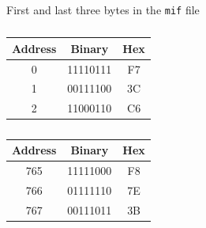 \documentclass[letterpaper, 12pt]{article} %
\begin{document}
\begin{table}[!htb]
    \caption{First and last three bytes in the \texttt{mif} file}
    \begin{subtable}{.5\linewidth}
      \centering
        \caption{}
        \begin{tabular}{|c|c|c|}
            \hline
            Address & Binary & Hex \\ \hline
            0 & 11110111 & F7 \\ \hline
            1 & 00111100 & 3C \\ \hline
            2 & 11000110 & C6 \\ \hline
        \end{tabular}
    \end{subtable}%
    \begin{subtable}{.5\linewidth}
      \centering
        \caption{}
        \begin{tabular}{|c|c|c|}
            \hline
            Address & Binary & Hex \\ \hline
            765 & 11111000 & F8 \\ \hline
            766 & 01111110 & 7E \\ \hline
            767 & 00111011 & 3B \\ \hline
        \end{tabular}
    \end{subtable} 
\end{table}
\end{document}
